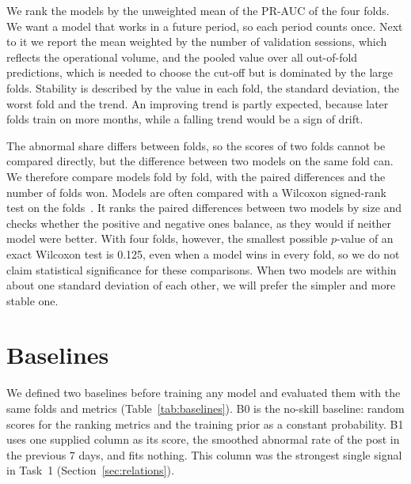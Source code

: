 \documentclass[12pt,a4paper,openany]{report}
\begin{document}
We rank the models by the unweighted mean of the \ac{PR-AUC} of the four folds. We want a model that works in a
future period, so each period counts once. Next to it we report the mean weighted by the number of validation
sessions, which reflects the operational volume, and the pooled value over all out-of-fold predictions, which is
needed to choose the cut-off but is dominated by the large folds. Stability is described by the value in each
fold, the standard deviation, the worst fold and the trend. An improving trend is partly expected, because later
folds train on more months, while a falling trend would be a sign of drift.

The abnormal share differs between folds, so the scores of two folds cannot be compared directly, but the
difference between two models on the same fold can. We therefore compare models fold by fold, with the paired
differences and the number of folds won. Models are often compared with a Wilcoxon signed-rank test on the
folds~\cite{mindd04}. It ranks the paired differences between two models by size and checks whether the positive and
negative ones balance, as they would if neither model were better. With four folds, however, the smallest possible $p$-value of an exact Wilcoxon test is 0.125, even when a model wins in every fold, so we do not claim statistical significance for these
comparisons. When two models are within about one standard deviation of each other, we will prefer the simpler and
more stable one.

\section{Baselines}\label{sec:baselines}

We defined two baselines before training any model and evaluated them with the same folds and metrics
(Table~\ref{tab:baselines}). B0 is the no-skill baseline: random scores for the ranking metrics and the training
prior as a constant probability. B1 uses one supplied column as its score, the smoothed abnormal rate of the post
in the previous 7 days, and fits nothing. This column was the strongest single signal in Task~1
(Section~\ref{sec:relations}).
\end{document}
